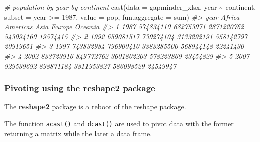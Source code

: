 \documentclass[
]{book}
\newenvironment{Shaded}{\begin{snugshade}}{\end{snugshade}}
\newcommand{\AttributeTok}[1]{\textcolor[rgb]{0.77,0.63,0.00}{#1}}
\newcommand{\CommentTok}[1]{\textcolor[rgb]{0.56,0.35,0.01}{\textit{#1}}}
\newcommand{\DecValTok}[1]{\textcolor[rgb]{0.00,0.00,0.81}{#1}}
\newcommand{\FunctionTok}[1]{\textcolor[rgb]{0.00,0.00,0.00}{#1}}
\newcommand{\NormalTok}[1]{#1}
\newcommand{\SpecialCharTok}[1]{\textcolor[rgb]{0.00,0.00,0.00}{#1}}
\newcommand{\StringTok}[1]{\textcolor[rgb]{0.31,0.60,0.02}{#1}}
\begin{document}
\begin{Shaded}
\begin{Highlighting}[]
\CommentTok{\# population by year by continent}
\FunctionTok{cast}\NormalTok{(}\AttributeTok{data =}\NormalTok{ gapminder\_xlsx,}
\NormalTok{     year }\SpecialCharTok{\textasciitilde{}}\NormalTok{ continent,}
     \AttributeTok{subset =}\NormalTok{ year }\SpecialCharTok{\textgreater{}=} \DecValTok{1987}\NormalTok{,}
     \AttributeTok{value =} \StringTok{\textquotesingle{}pop\textquotesingle{}}\NormalTok{,}
     \AttributeTok{fun.aggregate =}\NormalTok{ sum)}
\CommentTok{\#\textgreater{}   year    Africa  Americas       Asia    Europe  Oceania}
\CommentTok{\#\textgreater{} 1 1987 574834110 682753971 2871220762 543094160 19574415}
\CommentTok{\#\textgreater{} 2 1992 659081517 739274104 3133292191 558142797 20919651}
\CommentTok{\#\textgreater{} 3 1997 743832984 796900410 3383285500 568944148 22241430}
\CommentTok{\#\textgreater{} 4 2002 833723916 849772762 3601802203 578223869 23454829}
\CommentTok{\#\textgreater{} 5 2007 929539692 898871184 3811953827 586098529 24549947}
\end{Highlighting}
\end{Shaded}

\hypertarget{pivoting-using-the-reshape2-package}{%
\subsubsection{\texorpdfstring{Pivoting using the \textbf{reshape2} package}{Pivoting using the reshape2 package}}\label{pivoting-using-the-reshape2-package}}

The \textbf{reshape2} package is a reboot of the reshape package.

The function \texttt{acast()} and \texttt{dcast()} are used to pivot data with the former returning a matrix while the later a data frame.
\end{document}
